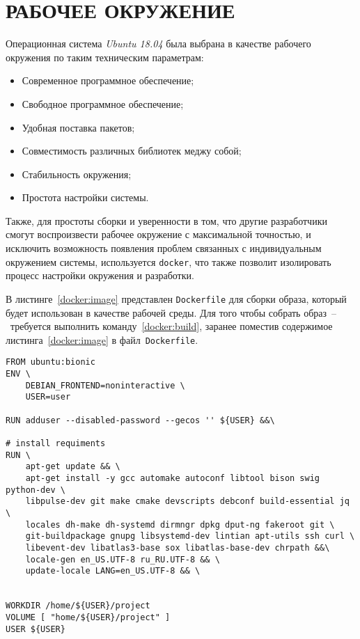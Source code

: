 \chapter{РАБОЧЕЕ ОКРУЖЕНИЕ}


Операционная система \textit{Ubuntu 18.04} была выбрана в качестве рабочего
окружения по таким техническим параметрам:

\begin{itemize}
    \item Современное программное обеспечение;
    \item Свободное программное обеспечение;
    \item Удобная поставка пакетов;
    \item Совместимость различных библиотек меджу собой;
    \item Стабильность окружения;
    \item Простота настройки системы.
\end{itemize}

Также, для простоты сборки и уверенности в том, что другие разработчики смогут
воспроизвести рабочее окружение с максимальной точностью, и исключить
возможность появления проблем связанных с индивидуальным окружением системы,
используется \texttt{docker}, что также позволит изолировать процесс настройки
окружения и разработки.

В листинге~\ref{docker:image} представлен \texttt{Dockerfile} для сборки образа,
который будет использован в качестве рабочей среды. Для того чтобы собрать
образ~--~требуется выполнить команду~\ref{docker:build}, заранее поместив
содержимое листинга~\ref{docker:image} в \linebreak файл~\texttt{Dockerfile}.

\begin{lstlisting}[caption={Dockerfile}, label={docker:image}]
FROM ubuntu:bionic
ENV \
    DEBIAN_FRONTEND=noninteractive \
    USER=user

RUN adduser --disabled-password --gecos '' ${USER} &&\

# install requiments
RUN \
    apt-get update && \
    apt-get install -y gcc automake autoconf libtool bison swig python-dev \
    libpulse-dev git make cmake devscripts debconf build-essential jq \
    locales dh-make dh-systemd dirmngr dpkg dput-ng fakeroot git \
    git-buildpackage gnupg libsystemd-dev lintian apt-utils ssh curl \
    libevent-dev libatlas3-base sox libatlas-base-dev chrpath &&\
    locale-gen en_US.UTF-8 ru_RU.UTF-8 && \
    update-locale LANG=en_US.UTF-8 && \


WORKDIR /home/${USER}/project
VOLUME [ "home/${USER}/project" ]
USER ${USER}
\end{lstlisting}

